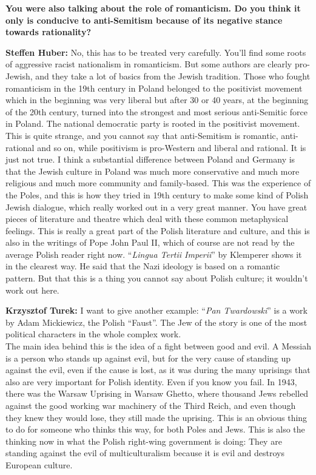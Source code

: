 \textbf{You were also talking about the role of romanticism. Do you think it only is conducive to anti-Semitism because of its negative stance towards rationality?} 

\textbf{Steffen Huber:} No, this has to be treated very carefully. You’ll find some roots of aggressive racist nationalism in romanticism. But some authors are clearly pro-Jewish, and they take a lot of basics from the Jewish tradition. Those who fought romanticism in the 19th century in Poland belonged to the positivist movement which in the beginning was very liberal but after 30 or 40 years, at the beginning of the 20th century, turned into the strongest and most serious anti-Semitic force in Poland. The national democratic party is rooted in the positivist movement. This is quite strange, and you cannot say that anti-Semitism is romantic, anti-rational and so on, while positivism is pro-Western and liberal and rational. It is just not true. I think a substantial difference between Poland and Germany is that the Jewish culture in Poland was much more conservative and much more religious and much more community and family-based. This was the experience of the Poles, and this is how they tried in 19th century to make some kind of Polish Jewish dialogue, which really worked out in a very great manner. You have great pieces of literature and theatre which deal with these common metaphysical feelings. This is really a great part of the Polish literature and culture, and this is also in the writings of Pope John Paul II, which of course are not read by the average Polish reader right now. ``\textit{Lingua Tertii Imperii}'' by Klemperer shows it in the clearest way. He said that the Nazi ideology is based on a romantic pattern. But that this is a thing you cannot say about Polish culture; it wouldn't work out here.\par 
\textbf{Krzysztof Turek:} I want to give another example: ``\textit{Pan Twardowski}'' is a work by Adam Mickiewicz, the Polish ``Faust''. The Jew of the story is one of the most political characters in the whole complex work.\\
The main idea behind this is the idea of a fight between good and evil. A Messiah is a person who stands up against evil, but for the very cause of standing up against the evil, even if the cause is lost, as it was during the many uprisings that also are very important for Polish identity. Even if you know you fail. In 1943, there was the Warsaw Uprising in Warsaw Ghetto, where thousand Jews rebelled against the good working war machinery of the Third Reich, and even though they knew they would lose, they still made the uprising. This is an obvious thing to do for someone who thinks this way, for both Poles and Jews. This is also the thinking now in what the Polish right-wing government is doing: They are standing against the evil of multiculturalism because it is evil and destroys European culture.\par
